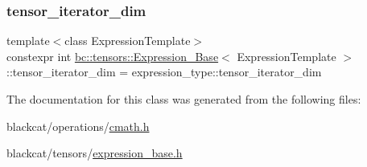 \subsubsection{\texorpdfstring{tensor\+\_\+iterator\+\_\+dim}{tensor\_iterator\_dim}}
{\footnotesize\ttfamily template$<$class Expression\+Template$>$ \\
constexpr int \hyperlink{classbc_1_1tensors_1_1Expression__Base}{bc\+::tensors\+::\+Expression\+\_\+\+Base}$<$ Expression\+Template $>$\+::tensor\+\_\+iterator\+\_\+dim = expression\+\_\+type\+::tensor\+\_\+iterator\+\_\+dim\hspace{0.3cm}{\ttfamily [static]}}



The documentation for this class was generated from the following files\+:\begin{DoxyCompactItemize}
\item 
blackcat/operations/\hyperlink{cmath_8h}{cmath.\+h}\item 
blackcat/tensors/\hyperlink{expression__base_8h}{expression\+\_\+base.\+h}\end{DoxyCompactItemize}
